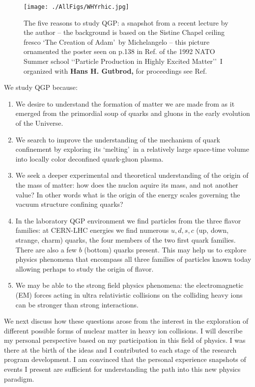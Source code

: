 \begin{figure}[tb]\sidecaption
\centerline{\texttt{[image: ./AllFigs/WHYrhic.jpg]}}
\caption{The five reasons to study QGP: a snapshot from a recent lecture by the author -- the background is based on the Sistine Chapel ceiling fresco \lq The Creation of Adam\rq\ by Michelangelo -- this picture ornamented the poster seen on p.138 in Ref.\cite{Rafelski:2016hnq} of the 1992 NATO Summer school \lq\lq Particle Production in Highly Excited Matter\rq\rq\ I organized with \textbf{Hans H. Gutbrod,} for proceedings see Ref.\cite{Gutbrod:1993rp}}
\label{WHYrhic}
\end{figure}

We study QGP because: 
\begin{enumerate}
\item
We desire to understand the formation of matter we are made from as it emerged from the primordial soup of quarks and gluons in the early evolution of the Universe\label{UniverseR1}.
\item
We search to improve the understanding of the mechanism of quark confinement by exploring its \lq melting\rq\ in a relatively large space-time volume into locally color deconfined quark-gluon plasma.
\item
We seek a deeper experimental and theoretical understanding of the origin of the mass of matter: how does the nuclon aquire its mass, and not another value? In other words what is the origin of the energy scales governing the vacuum structure confining quarks? 
\item 
In the laboratory QGP environment we find particles from the three flavor families: at CERN-LHC energies we find numerous $u,d,s,c$ (up, down, strange, charm) quarks, the four members of the two first quark families. There are also a few $b$ (bottom) quarks present. This may help us to explore physics phenomena that encompass all three families of particles known today allowing perhaps to study the origin of flavor.
\item
We may be able to the strong field physics phenomena: the electromagnetic (EM) forces acting in ultra relativistic collisions on the colliding heavy ions can be stronger than strong interactions. 
\end{enumerate}
 
We next discuss how these questions arose from the interest in the exploration of different possible forms of nuclear matter in heavy ion collisions. I will describe my personal perspective based on my participation in this field of physics. I was there at the birth of the ideas and I contributed to each stage of the research program development. I am convinced that the personal experience snapshots of events I present are sufficient for understanding the path into this new physics paradigm. 

